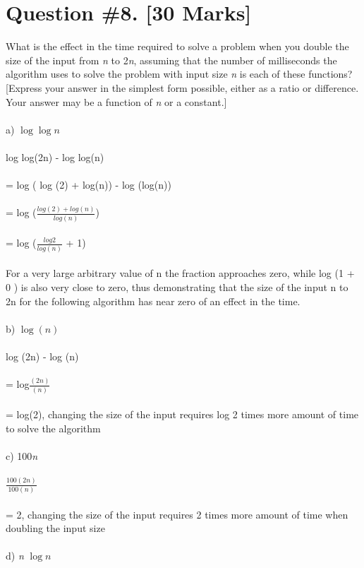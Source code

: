 \documentclass{article}
\begin{document}
{\section{Question \#8. [30 Marks]}
What is the effect in the time required to solve a problem when you double the size of the input from \emph{n} to 2\emph{n}, assuming that the number of milliseconds the algorithm uses to solve the problem with input size \emph{n} is each of these functions? [Express your answer in the simplest form possible, either as a ratio or difference. Your answer may be a function of \emph{n} or a constant.] \\ \\  
a) $\log\log{n}$ \\ \\ 
log log(2n) - log log(n) \\ \\ 
= log ( log (2) + log(n)) - log (log(n))  \\ \\ 
= log ($\frac{log(2) + log(n)}{log(n)}$) \\\\
= log ($\frac{log2}{log (n)}$ + 1) \\\\
For a very large arbitrary value of n the fraction approaches zero, while log (1 + 0 ) is also very close to zero, thus demonstrating that the size of the input n to 2n for the following algorithm has near zero of an effect in the time. \\\\
b) $\log(n)$ \\ \\ 
log (2n) - log (n)\\\\
= log$\frac{(2n)}{(n)}$\\ \\
= log(2), changing the size of the input requires log 2 times more amount of time to solve the algorithm \\\\ 
c) 100\emph{n} \\ \\ 
$\frac {100(2n)}{100(n)}$ \\\\
= 2, changing the size of the input requires 2 times more amount of time when doubling the input size  \\\\
d) \emph{n} $\log{n}$ \\ \\ 
}
\end{document}
